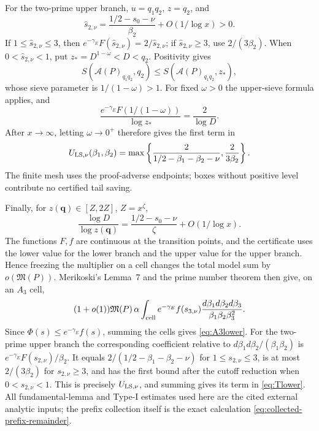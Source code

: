\documentclass[10pt,reqno]{amsart}
\newcommand{\Acal}{\mathcal{A}}
\newcommand{\1}{\mathbf{1}}
\theoremstyle{plain}
\theoremstyle{remark}
\begin{document}
For the two-prime upper branch, \(u=q_1q_2\), \(z=q_2\), and
\[
 \widehat s_{2,\nu}
 =\frac{1/2-s_0-\nu}{\beta_2}+O(1/\log x)>0.
\]
If \(1\le\widehat s_{2,\nu}\le3\), then
\(e^{-\gamma_E}F(\widehat s_{2,\nu})=2/\widehat s_{2,\nu}\);
if \(\widehat s_{2,\nu}\ge3\), use \(2/(3\beta_2)\).
When \(0<\widehat s_{2,\nu}<1\), put
\(z_*=D^{1-\omega}<D<q_2\).  Positivity gives
\[
 S(\Acal(P)_{q_1q_2},q_2)
 \le S(\Acal(P)_{q_1q_2},z_*),
\]
whose sieve parameter is \(1/(1-\omega)>1\).  For fixed \(\omega>0\)
the upper-sieve formula applies, and
\[
 \frac{e^{-\gamma_E}F(1/(1-\omega))}{\log z_*}
 =\frac{2}{\log D}.
\]
After \(x\to\infty\), letting \(\omega\to0^+\) therefore gives the first
term in
\[
 U_{{\rm LS},\nu}(\beta_1,\beta_2)
 =\max\left\{\frac2{1/2-\beta_1-\beta_2-\nu},
              \frac2{3\beta_2}\right\}.
\]
The finite mesh uses the proof-adverse endpoints; boxes without positive
level contribute no certified tail saving.

Finally, for \(z(\boldsymbol q)\in[Z,2Z]\), \(Z=x^\zeta\),
\[
 \frac{\log D}{\log z(\boldsymbol q)}
 =\frac{1/2-s_0-\nu}{\zeta}+O(1/\log x).
\]
The functions \(F,f\) are continuous at the transition points, and the
certificate uses the lower value for the lower branch and the upper value
for the upper branch.  Hence freezing the multiplier on a cell changes the
total model sum by \(o(\mathfrak M(P))\).  Merikoski's Lemma~7 and the prime
number theorem then give, on an \(A_3\) cell,
\[
 (1+o(1))\mathfrak M(P)\,\alpha
 \int_{\rm cell}e^{-\gamma_E}f(s_{3,\nu})
 \frac{d\beta_1d\beta_2d\beta_3}
      {\beta_1\beta_2\beta_3^2}.
\]
Since \(\Phi(s)\le e^{-\gamma_E}f(s)\), summing the cells gives
\eqref{eq:A3lower}.  For the two-prime upper branch the corresponding
coefficient relative to
\(d\beta_1d\beta_2/(\beta_1\beta_2)\) is
\(e^{-\gamma_E}F(s_{2,\nu})/\beta_2\).  It equals
\(2/(1/2-\beta_1-\beta_2-\nu)\) for \(1\le s_{2,\nu}\le3\), is at most
\(2/(3\beta_2)\) for \(s_{2,\nu}\ge3\), and has the first bound after the
cutoff reduction when \(0<s_{2,\nu}<1\).  This is precisely
\(U_{{\rm LS},\nu}\), and summing gives its term in \eqref{eq:Tlower}.
All fundamental-lemma and Type-I estimates used here are the cited external
analytic inputs; the prefix collection itself is the exact calculation
\eqref{eq:collected-prefix-remainder}.
\end{document}
